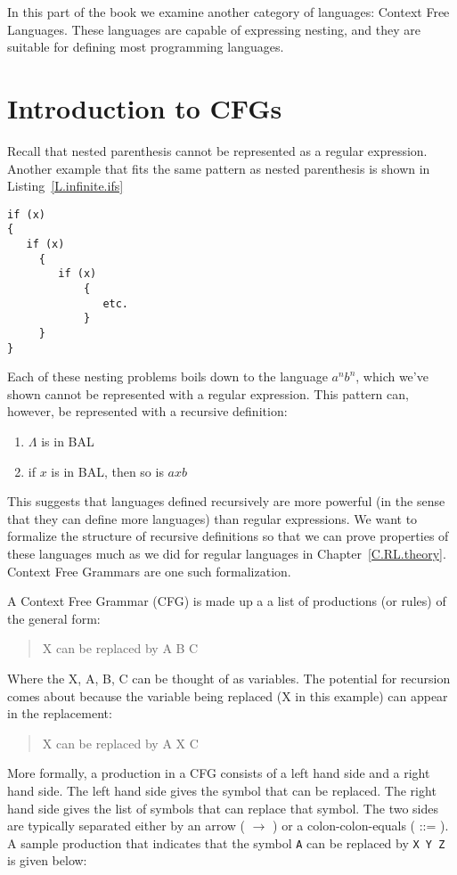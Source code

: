 \documentclass[letterpaper,12pt,openany,reqno]{book}%
\newcommand{\code}[1] {\lstinline[breaklines=yes,breakatwhitespace=yes]{#1}}
\begin{document}
In this part of the book we examine another category of languages: Context Free Languages. These languages are capable of expressing nesting, and they are suitable for defining most programming languages.

\section{Introduction to CFGs}
Recall that nested parenthesis cannot be represented as a regular expression. Another example that fits the same pattern as nested parenthesis is shown in Listing~\ref{L.infinite.ifs}
\begin{lstlisting}[caption={Nested if statements},label=L.infinite.ifs]
if (x)
{
   if (x)
	 {
	    if (x)
			{
			   etc.
			}
	 }
}
\end{lstlisting}
Each of these nesting problems boils down to the language $a^nb^n$, which we've shown cannot be represented with a regular expression. This pattern can, however, be represented with a recursive definition:
\begin{enumerate}
\item $\Lambda$ is in BAL
\item if $x$ is in BAL, then so is $axb$
\end{enumerate}

This suggests that languages defined recursively are more powerful (in the sense that they can define more languages) than regular expressions. We want to formalize the structure of recursive definitions so that we can prove properties of these languages much as we did for regular languages in Chapter~\ref{C.RL.theory}. Context Free Grammars are one such formalization.

A Context Free Grammar (CFG) is made up a a list of productions (or rules) of the general form:
\begin{quote}
X can be replaced by A B C
\end{quote}
Where the X, A, B, C can be thought of as variables. The potential for recursion comes about because the variable being replaced (X in this example) can appear in the replacement:
\begin{quote}
X can be replaced by A X C
\end{quote}

More formally, a production in a CFG consists of a left hand side and a right hand side. The left hand side gives the symbol that can be replaced. The right hand side gives the list of symbols that can replace that symbol. The two sides are typically separated 
either by an arrow ( $\rightarrow$ ) 
or a colon-colon-equals ( ::= ). 
A sample production that indicates that the symbol \code{A} 
can be replaced by \code{X Y Z} is given below:
\end{document}
